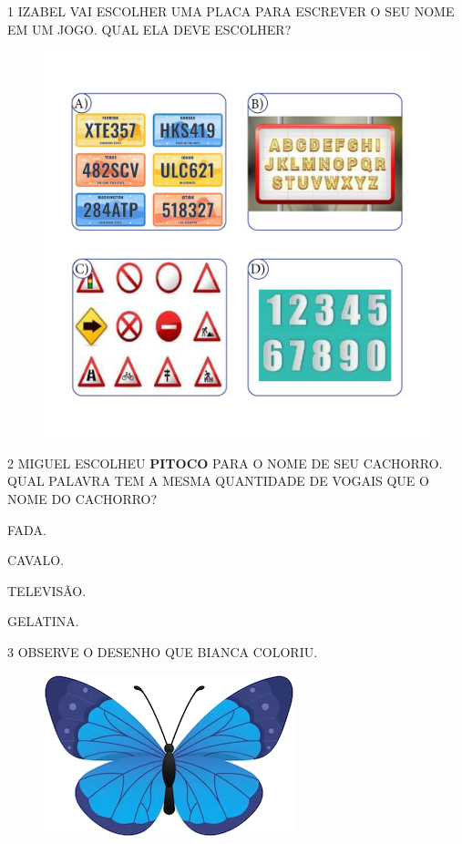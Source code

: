 \num{1} IZABEL VAI ESCOLHER UMA PLACA PARA ESCREVER O SEU NOME EM UM JOGO. QUAL ELA DEVE ESCOLHER?

\begin{figure}[H]
\includegraphics[width=\textwidth]{media/image222a225.png}
\end{figure}

\num{2} MIGUEL ESCOLHEU \textbf{PITOCO} PARA O NOME DE SEU CACHORRO.
QUAL PALAVRA TEM A MESMA QUANTIDADE DE VOGAIS QUE O NOME DO CACHORRO?

\begin{escolha}
\item FADA.

\item CAVALO.

\item TELEVISÃO.

\item GELATINA.
\end{escolha}

\num{3} OBSERVE O DESENHO QUE BIANCA COLORIU.

\begin{figure}[H]
\centering
\includegraphics[width=\textwidth]{media/image227.png}
\end{figure}


